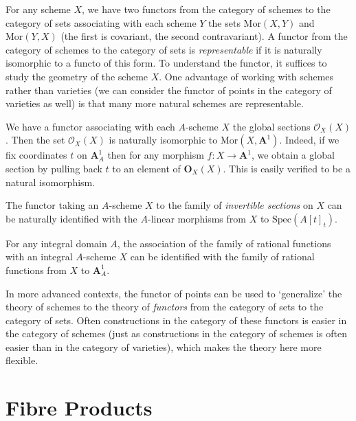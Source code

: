 For any scheme $X$, we have two functors from the category of schemes to the category of sets associating with each scheme $Y$ the sets $\text{Mor}(X,Y)$ and $\text{Mor}(Y,X)$ (the first is covariant, the second contravariant). A functor  from the category of schemes to the category of sets is \emph{representable} if it is naturally isomorphic to a functo of this form. To understand the functor, it suffices to study the geometry of the scheme $X$. One advantage of working with schemes rather than varieties (we can consider the functor of points in the category of varieties as well) is that many more natural schemes are representable.

\begin{example}
    We have a functor associating with each $A$-scheme $X$ the global sections $\mathcal{O}_X(X)$. Then the set $\mathcal{O}_X(X)$ is naturally isomorphic to $\text{Mor}(X,\mathbf{A}^1)$. Indeed, if we fix coordinates $t$ on $\mathbf{A}^1_A$ then for any morphism $f: X \to \mathbf{A}^1$, we obtain a global section by pulling back $t$ to an element of $\mathbf{O}_X(X)$. This is easily verified to be a natural isomorphism.
\end{example}

\begin{example}
    The functor taking an $A$-scheme $X$ to the family of \emph{invertible sections} on $X$ can be naturally identified with the $A$-linear morphisms from $X$ to $\text{Spec}(A[t]_{t})$.
\end{example}

\begin{example}
    For any integral domain $A$, the association of the family of rational functions with an integral $A$-scheme $X$ can be identified with the family of rational functions from $X$ to $\mathbf{A}^1_A$.
\end{example}

In more advanced contexts, the functor of points can be used to `generalize' the theory of schemes to the theory of \emph{functors} from the category of sets to the category of sets. Often constructions in the category of these functors is easier in the category of schemes (just as constructions in the category of schemes is often easier than in the category of varieties), which makes the theory here more flexible.









\section{Fibre Products}

